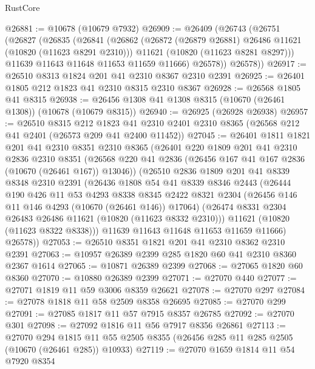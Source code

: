 \begin{lexlean}{RustCore}
\begin{coremodule}
@26881 := @10678 (@10679 @7932)
@26909 := @26409
    (@26743
      (@26751
        (@26827
          (@26835
            (@26841
              (@26862
                (@26872 (@26879 @26881) @26486 @11621 (@10820 (@11623 @8291 @2310)))
                @11621
                (@10820 (@11623 @8281 @8297)))
              @11639
              @11643
              @11648
              @11653
              @11659
              @11666)
            @26578))
        @26578))
@26917 := @26510 @8313 @1824 @201 @41 @2310 @8367 @2310 @2391
@26925 := @26401 @1805 @212 @1823 @41 @2310 @8315 @2310 @8367
@26928 := @26568 @1805 @41 @8315
@26938 := @26456 @1308 @41 @1308 @8315 (@10670 (@26461 @1308)) (@10678 (@10679 @8315))
@26940 := @26925 (@26928 @26938)
@26957 := @26510
    @8315
    @212
    @1823
    @41
    @2310
    @2401
    @2310
    @8365
    (@26568 @212 @41 @2401 (@26573 @209 @41 @2400 @11452))
@27045 := @26401
    @1811
    @1821
    @201
    @41
    @2310
    @8351
    @2310
    @8365
    (@26401
      @220
      @1809
      @201
      @41
      @2310
      @2836
      @2310
      @8351
      (@26568 @220 @41 @2836 (@26456 @167 @41 @167 @2836 (@10670 (@26461 @167)) @13046))
      (@26510
        @2836
        @1809
        @201
        @41
        @8339
        @8348
        @2310
        @2391
        (@26436
          @1808
          @54
          @41
          @8339
          @8346
          @2443
          (@26444
            @190
            @426
            @11
            @53
            @4293
            @8338
            @8345
            @2422
            @8321
            @2304
            (@26456 @146 @11 @146 @4293 (@10670 (@26461 @146)) @17064)
            (@26474 @8331 @2304 @26483 @26486 @11621 (@10820 (@11623 @8332 @2310)))
            @11621
            (@10820 (@11623 @8322 @8338)))
          @11639
          @11643
          @11648
          @11653
          @11659
          @11666)
        @26578))
@27053 := @26510 @8351 @1821 @201 @41 @2310 @8362 @2310 @2391
@27063 := @10957 @26389 @2399 @285 @1820 @60 @41 @2310 @8360 @2367 @1614
@27065 := @10871 @26389 @2399
@27068 := @27065 @1820 @60 @8360
@27070 := @10880 @26389 @2399
@27071 := @27070 @440
@27077 := @27071 @1819 @11 @59 @3006 @8359 @26621
@27078 := @27070 @297
@27084 := @27078 @1818 @11 @58 @2509 @8358 @26695
@27085 := @27070 @299
@27091 := @27085 @1817 @11 @57 @7915 @8357 @26785
@27092 := @27070 @301
@27098 := @27092 @1816 @11 @56 @7917 @8356 @26861
@27113 := @27070
    @294
    @1815
    @11
    @55
    @2505
    @8355
    (@26456 @285 @11 @285 @2505 (@10670 (@26461 @285)) @10933)
@27119 := @27070 @1659 @1814 @11 @54 @7920 @8354

\end{coremodule}
\end{lexlean}
